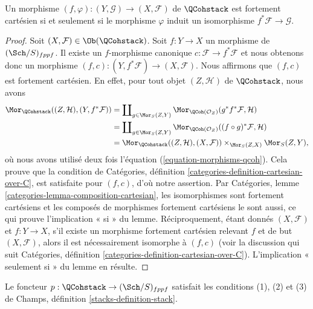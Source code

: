 \begin{lemma}
\label{lemma-quasi-coherent-strongly-cartesian}
Un morphisme $(f, \varphi) : (Y, \mathcal{G}) \to (X, \mathcal{F})$
de $\QCohstack$ est fortement cartésien si et seulement si le
morphisme $\varphi$ induit un isomorphisme $f^*\mathcal{F} \to \mathcal{G}$.
\end{lemma}

\begin{proof}
Soit $(X, \mathcal{F}) \in \Ob(\QCohstack)$.
Soit $f : Y \to X$ un morphisme de $(\Sch/S)_{fppf}$.
Il existe un $f$-morphisme canonique $c : \mathcal{F} \to f^*\mathcal{F}$
et nous obtenons donc un morphisme
$(f, c) : (Y, f^*\mathcal{F}) \to (X, \mathcal{F})$.
Nous affirmons que $(f, c)$ est fortement cartésien.
En effet, pour tout objet $(Z, \mathcal{H})$ de $\QCohstack$, nous avons
\begin{align*}
\Mor_{\QCohstack}((Z, \mathcal{H}), (Y, f^*\mathcal{F}))
& =
\coprod\nolimits_{g \in \Mor_S(Z, Y)}
\Mor_{\QCoh(\mathcal{O}_Z)}(g^*f^*\mathcal{F}, \mathcal{H}) \\
& =
\coprod\nolimits_{g \in \Mor_S(Z, Y)}
\Mor_{\QCoh(\mathcal{O}_Z)}((f \circ g)^*\mathcal{F}, \mathcal{H}) \\
& =
\Mor_{\QCohstack}((Z, \mathcal{H}), (X, \mathcal{F}))
\times_{\Mor_S(Z, X)} \Mor_S(Z, Y),
\end{align*}
où nous avons utilisé deux fois l'équation (\ref{equation-morphisms-qcoh}).
Cela prouve que la condition de
Catégories, définition \ref{categories-definition-cartesian-over-C},
est satisfaite pour $(f, c)$, d'où notre assertion. Par
Catégories, lemme \ref{categories-lemma-composition-cartesian},
les isomorphismes sont fortement cartésiens et
les composés de morphismes fortement cartésiens le sont aussi,
ce qui prouve l'implication « si » du lemme. Réciproquement,
étant donnés $(X, \mathcal{F})$ et $f : Y \to X$, s'il existe un
morphisme fortement cartésien relevant $f$ et de but $(X, \mathcal{F})$,
alors il est nécessairement isomorphe à $(f, c)$ (voir la discussion qui suit
Catégories, définition \ref{categories-definition-cartesian-over-C}).
L'implication « seulement si » du lemme en résulte.
\end{proof}

\begin{lemma}
\label{lemma-stack-of-quasi-coherent-sheaves}
Le foncteur $p : \QCohstack \to (\Sch/S)_{fppf}$
satisfait les conditions (1), (2) et (3) de
Champs, définition \ref{stacks-definition-stack}.
\end{lemma}

